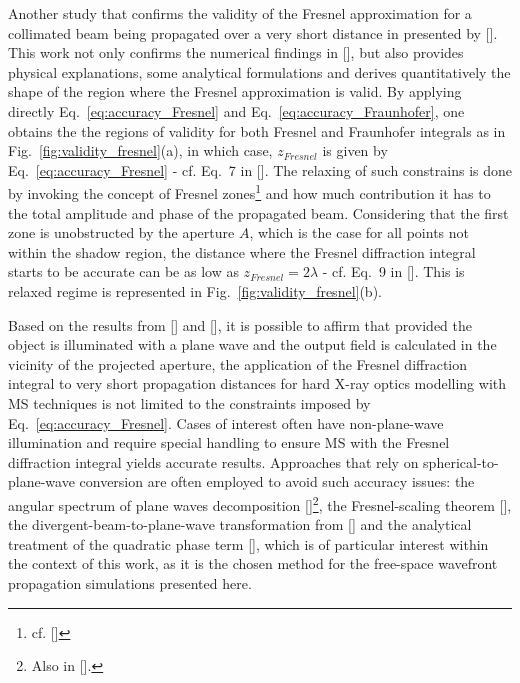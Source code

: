 \begin{refsection}
Another study that confirms the validity of the Fresnel approximation for a collimated beam being propagated over a very short distance in presented by [\cite{Rees87}]. This work not only confirms the numerical findings in [\cite{Southwell1981}], but also provides physical explanations, some analytical formulations and derives quantitatively the shape of the region where the Fresnel approximation is valid. By applying directly Eq.~\ref{eq:accuracy_Fresnel} and  Eq.~\ref{eq:accuracy_Fraunhofer}, one obtains the the regions of validity for both Fresnel and Fraunhofer integrals as in Fig.~\ref{fig:validity_fresnel}(a), in which case, $z_{Fresnel}$ is given by Eq.~\ref{eq:accuracy_Fresnel} - cf. Eq.~7 in [\cite{Rees87}]. The relaxing of such constrains is done by invoking the concept of Fresnel zones\footnote{cf. [\cite{Hetch}]} and how much contribution it has to the total amplitude and phase of the propagated beam. Considering that the first zone is unobstructed by the aperture $A$, which is the case for all points not within the shadow region, the distance where the Fresnel diffraction integral starts to be accurate can be as low as $z_{Fresnel}=2\lambda$ - cf. Eq.~9 in [\cite{Rees87}]. This is relaxed regime is represented in Fig.~\ref{fig:validity_fresnel}(b).

Based on the results from [\cite{Southwell1981}] and [\cite{Rees87}], it is possible to affirm that provided the object is illuminated with a plane wave and the output field is calculated in the vicinity of the projected aperture, the application of the Fresnel diffraction integral to very short propagation distances for hard X-ray optics modelling with MS techniques is not limited to the constraints imposed by Eq.~\ref{eq:accuracy_Fresnel}. Cases of interest often have non-plane-wave illumination and require special handling to ensure MS with the Fresnel diffraction integral yields accurate results. Approaches that rely on spherical-to-plane-wave conversion are often employed to avoid such accuracy issues: the angular spectrum of plane waves decomposition [\cite[\textit{\S1.3}]{Paganin2006}]\footnote{Also in [\cite[\textit{\S3.10}~\&~\textit{\S4.2.4}]{Goodman2017}].}, the Fresnel-scaling theorem [\cite[\textit{\S A}]{Paganin2006}], the divergent-beam-to-plane-wave transformation from [\cite{Munro2019}] and the analytical treatment of the quadratic phase term [\cite{Chubar2019}], which is of particular interest within the context of this work, as it is the chosen method for the free-space wavefront propagation simulations presented here. 


\end{refsection}
